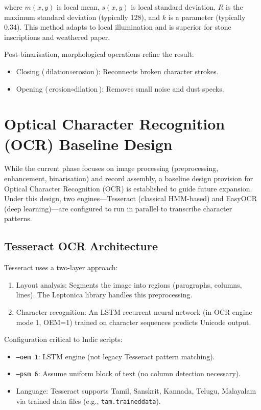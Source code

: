 where $m(x,y)$ is local mean, $s(x,y)$ is local standard deviation, $R$ is the maximum standard deviation (typically 128), and $k$ is a parameter (typically 0.34). This method adapts to local illumination and is superior for stone inscriptions and weathered paper.

Post-binarisation, morphological operations refine the result:
\begin{itemize}
	\item Closing ($\text{dilation} \circ \text{erosion}$): Reconnects broken character strokes.
	\item Opening ($\text{erosion} \circ \text{dilation}$): Removes small noise and dust specks.
\end{itemize}

\section{Optical Character Recognition (OCR) Baseline Design}

While the current phase focuses on image processing (preprocessing, enhancement, binarisation) and record assembly, a baseline design provision for Optical Character Recognition (OCR) is established to guide future expansion. Under this design, two engines—Tesseract (classical HMM-based) and EasyOCR (deep learning)—are configured to run in parallel to transcribe character patterns.

\subsection{Tesseract OCR Architecture}

Tesseract uses a two-layer approach:

\begin{enumerate}
	\item Layout analysis: Segments the image into regions (paragraphs, columns, lines). The Leptonica library handles this preprocessing.
	\item Character recognition: An LSTM recurrent neural network (in OCR engine mode 1, OEM=1) trained on character sequences predicts Unicode output.
\end{enumerate}

Configuration critical to Indic scripts:
\begin{itemize}
	\item \texttt{--oem 1}: LSTM engine (not legacy Tesseract pattern matching).
	\item \texttt{--psm 6}: Assume uniform block of text (no column detection necessary).
	\item Language: Tesseract supports Tamil, Sanskrit, Kannada, Telugu, Malayalam via trained data files (e.g., \texttt{tam.traineddata}).
\end{itemize}

